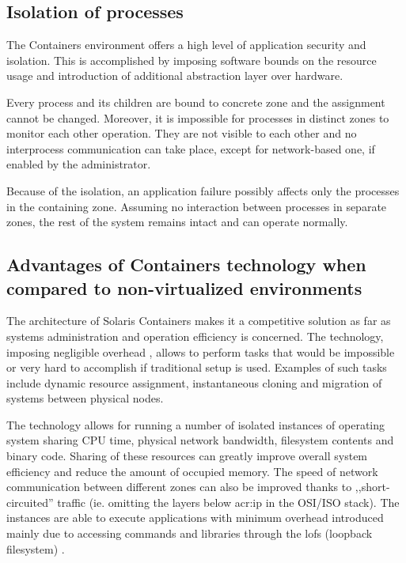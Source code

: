 \documentclass[11pt]{book}
\begin{document}
      \subsection{Isolation of processes}
      \label{sub:}

        The Containers environment offers a high level of application security and isolation. This is accomplished by
        imposing software bounds on the resource usage and introduction of additional abstraction layer over hardware.

        Every process and its children are bound to concrete zone and the assignment cannot be changed. Moreover, it is
        impossible for processes in distinct zones to monitor each other operation. They are not visible to each other
        and no interprocess communication can take place, except for network-based one, if enabled by the administrator.

        Because of the isolation, an application failure possibly affects only the processes in the containing zone.
        Assuming no interaction between processes in separate zones, the rest of the system remains intact and can
        operate normally.
        
      

      \subsection{Advantages of Containers technology when compared to non-virtualized environments}
      \label{sub:}

        The architecture of Solaris Containers makes it a competitive solution as far as systems administration and
        operation efficiency is concerned. The technology, imposing negligible overhead \cite{price}, allows to perform
        tasks that would be impossible or very hard to accomplish if traditional setup is used. Examples of such tasks
        include dynamic resource assignment, instantaneous cloning and migration of systems between physical nodes.

        The technology allows for running a number of isolated instances of operating system sharing CPU time,
        physical network bandwidth, filesystem contents and binary code. Sharing of these resources can greatly improve
        overall system efficiency and reduce the amount of occupied memory. The speed of network communication between
        different zones can also be improved thanks to ,,short-circuited'' traffic (ie. omitting the layers below \gls{acr:ip} in
        the OSI/ISO stack). The instances are able to execute applications with minimum overhead introduced mainly due
        to accessing commands and libraries through the lofs (loopback filesystem) \cite{price,fsag}.
\end{document}
